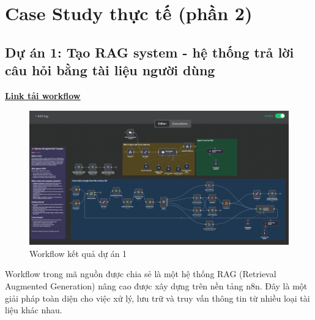 \chapter{Case Study thực tế (phần 2)}

\section{\textbf{Dự án 1: Tạo RAG system - hệ thống trả lời câu hỏi bằng tài liệu người dùng}}

\href{https://drive.google.com/file/d/1SwPcQe6HypodnICqbvVpzWVUKQA8_PLI/view?usp=sharing}{\textbf{\underline {Link tải workflow}}}

\begin{figure}[H]
    \centering
    \includegraphics[width=1\textwidth]{images/1rag01.pdf}
    \caption{Workflow kết quả dự án 1}

\end{figure}

Workflow trong mã nguồn được chia sẻ là một hệ thống RAG (Retrieval Augmented Generation) nâng cao được xây dựng trên nền tảng n8n. Đây là một giải pháp toàn diện cho việc xử lý, lưu trữ và truy vấn thông tin từ nhiều loại tài liệu khác nhau.

